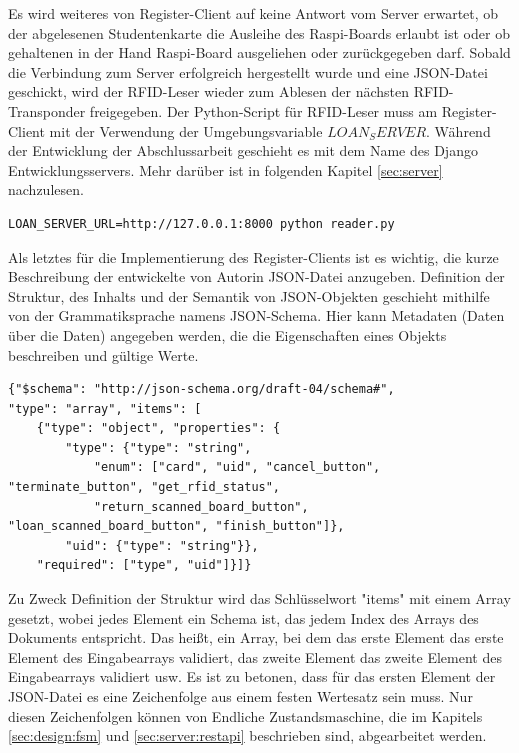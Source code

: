 Es wird weiteres von Register-Client auf keine Antwort vom Server erwartet, ob der abgelesenen Studentenkarte die Ausleihe des Raspi-Boards erlaubt ist oder ob gehaltenen in der Hand Raspi-Board ausgeliehen oder zurückgegeben darf. Sobald die Verbindung zum Server erfolgreich hergestellt wurde und eine JSON-Datei geschickt, wird der RFID-Leser wieder zum Ablesen der nächsten RFID-Transponder freigegeben. Der Python-Script für RFID-Leser muss am Register-Client mit der Verwendung der Umgebungsvariable $LOAN_SERVER$. Während der Entwicklung der Abschlussarbeit geschieht es mit dem Name des Django Entwicklungsservers. Mehr darüber ist in folgenden Kapitel \ref{sec:server} nachzulesen.
\begin{lstlisting}[caption={[Umgebungsvariable für den Serverstart] },captionpos=b]
LOAN_SERVER_URL=http://127.0.0.1:8000 python reader.py
\end{lstlisting}
Als letztes für die Implementierung des Register-Clients ist es wichtig, die kurze Beschreibung der entwickelte von Autorin JSON-Datei anzugeben. Definition der Struktur, des Inhalts und der Semantik von JSON-Objekten geschieht mithilfe von der Grammatiksprache namens JSON-Schema. Hier kann Metadaten (Daten über die Daten) angegeben werden, die die Eigenschaften eines Objekts beschreiben und gültige Werte. 

\begin{lstlisting}[caption={JSON-Schema},captionpos=b]
{"$schema": "http://json-schema.org/draft-04/schema#",
"type": "array", "items": [
	{"type": "object", "properties": {
		"type": {"type": "string",
			"enum": ["card", "uid", "cancel_button", "terminate_button", "get_rfid_status",
			"return_scanned_board_button", "loan_scanned_board_button", "finish_button"]},
		"uid": {"type": "string"}},
	"required": ["type", "uid"]}]}
\end{lstlisting}

Zu Zweck Definition der Struktur wird das Schlüsselwort "items" mit einem Array gesetzt, wobei jedes Element ein Schema ist, das jedem Index des Arrays des Dokuments entspricht. Das heißt, ein Array, bei dem das erste Element das erste Element des Eingabearrays validiert, das zweite Element das zweite Element des Eingabearrays validiert usw\cite{website:14}. Es ist zu betonen, dass für das ersten Element der JSON-Datei es eine Zeichenfolge aus einem festen Wertesatz sein muss. Nur diesen Zeichenfolgen können von Endliche Zustandsmaschine, die im Kapitels \ref{sec:design:fsm} und \ref{sec:server:restapi} beschrieben sind, abgearbeitet werden. 

